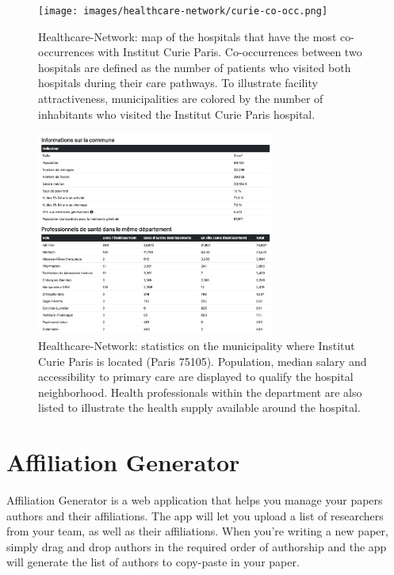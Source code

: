 \begin{figure}[H]
    \texttt{[image: images/healthcare-network/curie-co-occ.png]}
    \centering
    \caption{
        Healthcare-Network: map of the hospitals that have the most co-occurrences with Institut Curie Paris. Co-occurrences between two hospitals are defined as the number of patients who visited both hospitals during their care pathways. To illustrate facility attractiveness, municipalities are colored by the number of inhabitants who visited the Institut Curie Paris hospital.
    }
    \label{fig:hn-curie-co-occ}
\end{figure}


\begin{figure}[H]
    \includegraphics[width=0.7\textwidth]{images/healthcare-network/curie-commune.png}
    \centering
    \caption{
        Healthcare-Network: statistics on the municipality where Institut Curie Paris is located (Paris 75105). Population, median salary and accessibility to primary care are displayed to qualify the hospital neighborhood. Health professionals within the department are also listed to illustrate the health supply available around the hospital.
    }
    \label{fig:hn-curie-commune}
\end{figure}


\section{Affiliation Generator}

Affiliation Generator is a web application that helps you manage your papers authors and their affiliations. The app will let you upload a list of researchers from your team, as well as their affiliations. When you're writing a new paper, simply drag and drop authors in the required order of authorship and the app will generate the list of authors to copy-paste in your paper.

